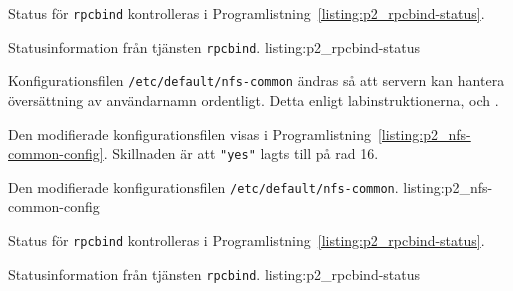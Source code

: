 Status för \texttt{rpcbind} kontrolleras i
Programlistning~\ref{listing:p2_rpcbind-status}.

						{Statusinformation från tjänsten \texttt{rpcbind}.}
            {listing:p2_rpcbind-status}


Konfigurationsfilen \texttt{/etc/default/nfs-common} ändras så att servern kan
hantera översättning av användarnamn ordentligt.
Detta enligt labinstruktionerna\cite{dvg001:instruktionerLab5}, 
\cite{ubuntu:NFSv4howto} och \cite{ubuntu:settingupNFShowto}.

Den modifierade konfigurationsfilen visas i
Programlistning~\ref{listing:p2_nfs-common-config}.
Skillnaden är att \texttt{"yes"} lagts till på rad 16.

						{Den modifierade konfigurationsfilen
						 \texttt{/etc/default/nfs-common}.}
            {listing:p2_nfs-common-config}


Status för \texttt{rpcbind} kontrolleras i
Programlistning~\ref{listing:p2_rpcbind-status}.

						{Statusinformation från tjänsten \texttt{rpcbind}.}
            {listing:p2_rpcbind-status}
